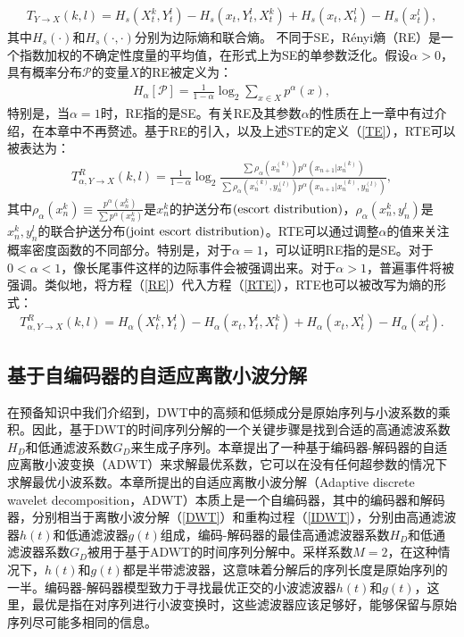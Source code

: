 \begin{align}\label{STE}
T_{Y\rightarrow X}(k,l) = H_{s}(X_{t}^{k},Y_{t}^{l})-H_{s}(x_{t},Y_{t}^{l},X_{t}^{k})+H_{s}(x_{t},X_{t}^{l})-H_{s}(x_{t}^{l}),
\end{align}
其中$H_{s}(\cdot)$和$H_{s}(\cdot, \cdot)$分别为边际熵和联合熵。
不同于SE，R\'enyi熵（RE）是一个指数加权的不确定性度量的平均值，在形式上为SE的单参数泛化。假设$\alpha>0$，具有概率分布$\mathcal{P}$的变量$X$的RE被定义为：
\begin{align}\label{RE}
H_{\alpha}[\mathcal{P}] =\frac{1}{1- \alpha}\log_{2}\sum\limits_{x\in X}p^{\alpha}(x),
\end{align}
特别是，当$\alpha=1$时，RE指的是SE。有关RE及其参数$\alpha$的性质在上一章中有过介绍，在本章中不再赘述。基于RE的引入，以及上述STE的定义（\ref{TE}），RTE可以被表达为：
\begin{align}\label{RTE}
T^{R}_{\alpha, Y\rightarrow X}(k,l) =\frac{1}{1- \alpha}\log_{2}\frac{\sum \rho_{\alpha}(x^{(k)}_{n}) p^{\alpha}(x_{n+1}|x_{n}^{(k)})}{\sum \rho_{\alpha}(x^{(k)}_{n}, y_{n}^{(l)}) p^{\alpha}(x_{n+1}|x_{n}^{(k)},y_{n}^{(l)})},
\end{align}
其中$\rho_{\alpha}(x^{k}_{n}) \equiv \frac{p^{\alpha}(x^{k}_{n})}{\sum p^{\alpha}(x^{k}_{n})}$是$x^{k}_{n}$的护送分布$(\rm{escort\ distribution})$，$\rho_{\alpha}(x^{k}_{n}, y_{n}^{l})$是$x^{k}_{n}, y_{n}^{l}$的联合护送分布$(\rm{joint\ escort\ distribution})$。RTE可以通过调整$\alpha$的值来关注概率密度函数的不同部分。特别是，对于$\alpha=1$，可以证明RE指的是SE。对于$0< \alpha<1$，像长尾事件这样的边际事件会被强调出来。对于$\alpha>1$，普遍事件将被强调。类似地，将方程（\ref{RE}）代入方程（\ref{RTE}），RTE也可以被改写为熵的形式：
\begin{align}\label{RTEs}
T^{R}_{\alpha, Y\rightarrow X}(k,l) = H_{\alpha}(X_{t}^{k},Y_{t}^{l})-H_{\alpha}(x_{t},Y_{t}^{l},X_{t}^{k})
+H_{\alpha}(x_{t},X_{t}^{l})-H_{\alpha}(x_{t}^{l}).
\end{align}

\subsection{基于自编码器的自适应离散小波分解}
在预备知识中我们介绍到，DWT中的高频和低频成分是原始序列与小波系数的乘积。因此，基于DWT的时间序列分解的一个关键步骤是找到合适的高通滤波系数$H_{D}$和低通滤波系数$G_{D}$来生成子序列。本章提出了一种基于编码器-解码器的自适应离散小波变换（ADWT）来求解最优系数，它可以在没有任何超参数的情况下求解最优小波系数。本章所提出的自适应离散小波分解（Adaptive discrete wavelet decomposition，ADWT）本质上是一个自编码器，其中的编码器和解码器，分别相当于离散小波分解（\ref{DWT}）和重构过程（\ref{IDWT}），分别由高通滤波器$h(t)$和低通滤波器$g(t)$组成，编码-解码器的最佳高通滤波器系数$H_{D}$和低通滤波器系数$G_{D}$被用于基于ADWT的时间序列分解中。采样系数$M=2$，在这种情况下，$h(t)$和$g(t)$都是半带滤波器，这意味着分解后的序列长度是原始序列的一半。编码器-解码器模型致力于寻找最优正交的小波滤波器$h(t)$和$g(t)$，这里，最优是指在对序列进行小波变换时，这些滤波器应该足够好，能够保留与原始序列尽可能多相同的信息。

